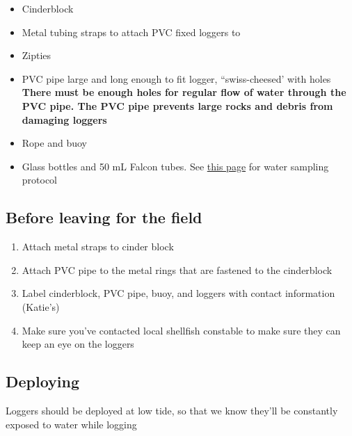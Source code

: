 \documentclass[
  letterpaper,
  DIV=11,
  numbers=noendperiod]{scrreprt}
\begin{document}
\begin{itemize}
\item
  Cinderblock
\item
  Metal tubing straps to attach PVC fixed loggers to
\item
  Zipties
\item
  PVC pipe large and long enough to fit logger, ``swiss-cheesed' with
  holes \textbf{There must be enough holes for regular flow of water
  through the PVC pipe. The PVC pipe prevents large rocks and debris
  from damaging loggers}
\item
  Rope and buoy
\item
  Glass bottles and 50 mL Falcon tubes. See
  \href{https://bmford11.github.io/lotterhoslabprotocols/watersampling/}{this
  page} for water sampling protocol
\end{itemize}

\hypertarget{before-leaving-for-the-field}{%
\subsection*{\texorpdfstring{\textbf{Before leaving for the
field}}{Before leaving for the field}}\label{before-leaving-for-the-field}}

\begin{enumerate}
\def\labelenumi{\arabic{enumi}.}
\item
  Attach metal straps to cinder block
\item
  Attach PVC pipe to the metal rings that are fastened to the
  cinderblock
\item
  Label cinderblock, PVC pipe, buoy, and loggers with contact
  information (Katie's)
\item
  Make sure you've contacted local shellfish constable to make sure they
  can keep an eye on the loggers
\end{enumerate}

\hypertarget{deploying}{%
\subsection*{\texorpdfstring{\textbf{Deploying}}{Deploying}}\label{deploying}}

Loggers should be deployed at low tide, so that we know they'll be
constantly exposed to water while logging
\end{document}
